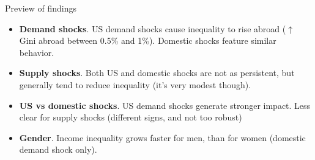 \documentclass[10pt,leqno,aspectratio=169,presentation]{beamer} %
\begin{document}
\begin{frame}{Preview of findings}
    \begin{itemize}
        \item \textbf{Demand shocks}. US demand shocks cause inequality to rise abroad ($\uparrow$ Gini abroad between 0.5\% and 1\%). Domestic shocks feature similar behavior.
        \item \textbf{Supply shocks}. Both US and domestic shocks are not as persistent, but generally tend to reduce inequality (it's very modest though).
        \item \textbf{US vs domestic shocks}. US demand shocks generate stronger impact. Less clear for supply shocks (different signs, and not too robust)
        \item \textbf{Gender}. Income inequality grows faster for men, than for women (domestic demand shock only).
    \end{itemize}
\end{frame}
\end{document}
